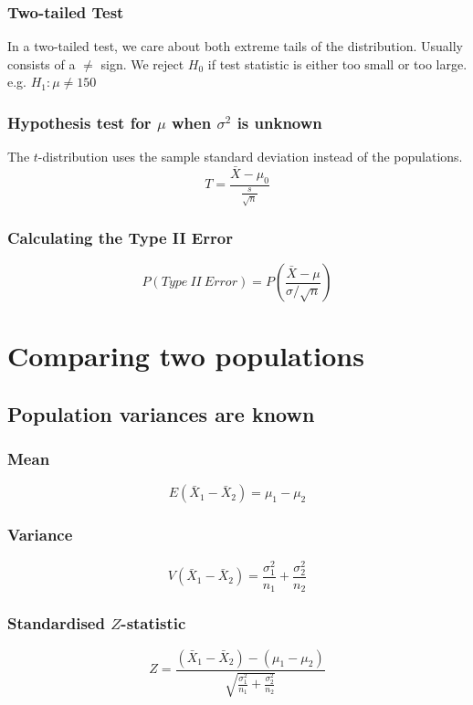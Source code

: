 \documentclass{article}
\begin{document}
\subsubsection{Two-tailed Test}
In a two-tailed test, we care about both extreme tails of the distribution. Usually consists of a $\neq$ sign. We reject $H_0$ if test statistic is either too small or too large.
e.g. $ H_1 : \mu \neq 150$

\subsubsection{Hypothesis test for $\mu$ when $\sigma^2$ is unknown}
The $t$-distribution uses the sample standard deviation instead of the populations.
$$
T = \frac{\bar{X} - \mu_0}{\frac{s}{\sqrt{n}}}
$$

\subsubsection{Calculating the Type II Error}

$$
P(Type\:II\:Error) = P\left(\frac{\bar{X} - \mu}{\sigma/\sqrt{n}} \right)
$$


\section{Comparing two populations}

\subsection{Population variances are known}

\subsubsection{Mean}
$$
E(\bar{X}_1 - \bar{X}_2) = \mu_1 - \mu_2
$$

\subsubsection{Variance}
$$
V(\bar{X}_1 - \bar{X}_2) = \frac{\sigma^2_1}{n_1} + \frac{\sigma^2_2}{n_2}
$$

\subsubsection{Standardised $Z$-statistic}
$$
Z = \frac{(\bar{X}_1 - \bar{X}_2) - (\mu_1 - \mu_2)}{\sqrt{\frac{\sigma^2_1}{n_1}+\frac{\sigma^2_2}{n_2}}}
$$
\\
\end{document}
